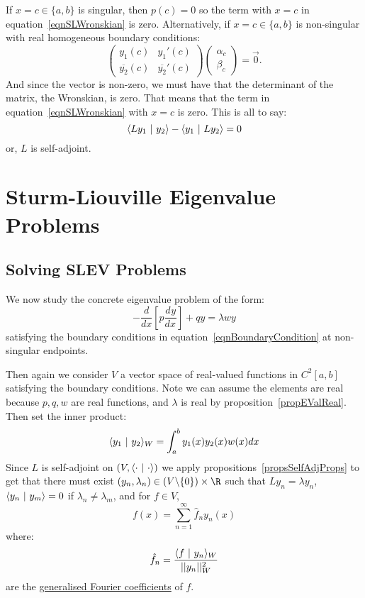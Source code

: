 \documentclass[../Main.tex]{subfiles}
\begin{document}
If $x = c \in \{a, b\}$ is singular, then $p(c) = 0$ so the term with $x = c$ in equation~\ref{eqnSLWronskian} is zero. Alternatively, if $x = c \in \{a, b\}$ is non-singular with real homogeneous boundary conditions:
\begin{equation*}
    \begin{pmatrix}
        y_1(c) & y_1'(c) \\
        \overline{y_2}(c) & \overline{y_2}'(c)
    \end{pmatrix}
    \begin{pmatrix} \alpha_c \\ \beta_c\end{pmatrix} = \vec{0}.
\end{equation*}
And since the vector is non-zero, we must have that the determinant of the matrix, the Wronskian, is zero. That means that the term in equation~\ref{eqnSLWronskian} with $x = c$ is zero. This is all to say:
\begin{equation}
    \langle Ly_1~\vert~y_2\rangle - \langle y_1~\vert~Ly_2\rangle = 0
    \label{eqnSLIsSelfAdj}
\end{equation}
or, $L$ is self-adjoint.
\section{Sturm-Liouville Eigenvalue Problems}
\subsection{Solving SLEV Problems}
We now study the concrete eigenvalue problem of the form:
\begin{equation}
    -\frac{d}{dx}\left[p \frac{d^{}y}{dx^{}}\right] + qy = \lambda w y
    \label{eqnSLEvalProb}
\end{equation}
satisfying the boundary conditions in equation~\ref{eqnBoundaryCondition} at non-singular endpoints.

Then again we consider $V$ a vector space of real-valued functions in $C^2[a, b]$ satisfying the boundary conditions. Note we can assume the elements are real because $p, q, w$ are real functions, and $\lambda$ is real by proposition~\ref{propEValReal}. Then set the inner product:
\begin{equation*}
    \langle y_1~\vert~y_2\rangle_W = \int_{a}^{b} y_1(x) y_2(x) w(x) dx 
\end{equation*}
Since $L$ is self-adjoint on $(V, \langle \cdot~\vert~\cdot\rangle)$ we apply propositions~\ref{propsSelfAdjProps} to get that there must exist $(y_n, \lambda_n) \in (V \backslash \{0\}) \times \R$ such that $Ly_n = \lambda y_n$, $\langle y_n~\vert~y_m\rangle = 0$ if $\lambda_n \neq \lambda_m$, and for $f \in V$,
\begin{equation*}
    f(x) = \sum_{n=1}^{\infty}\hat{f}_n y_n(x)
\end{equation*}
where:
\begin{equation*}
    \hat{f}_n = \frac{\langle f~\vert~y_n\rangle_W}{||y_n||_W^2}
\end{equation*}
are the \underline{generalised Fourier coefficients} of $f$.
\end{document}
